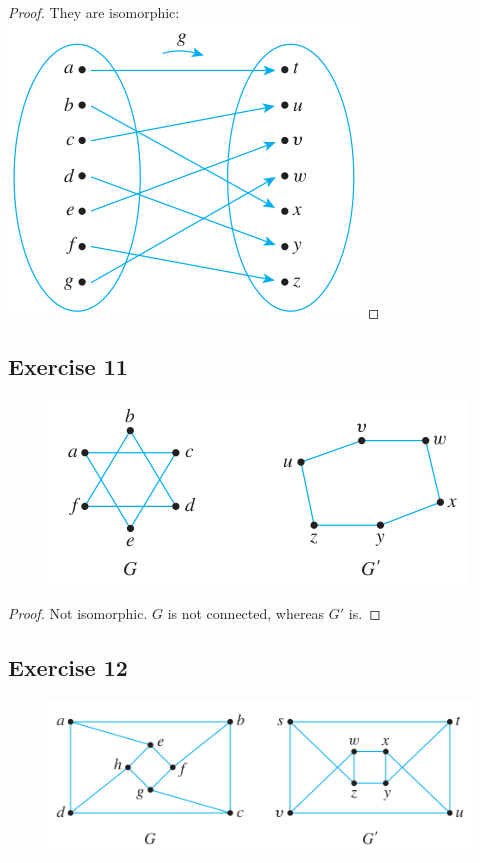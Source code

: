 \documentclass[14pt]{extarticle}
\begin{document}
\begin{proof}
    They are isomorphic:
    \includegraphics[scale=0.4]{../images/10.3.10.1.png}
\end{proof}

\subsection{Exercise 11}
\begin{figure}[ht!]
    \centering
    \includegraphics[scale=0.5]{../images/10.3.11.png}
\end{figure}

\begin{proof}
    Not isomorphic. \(G\) is not connected, whereas \(G'\) is.
\end{proof}

\subsection{Exercise 12}
\begin{figure}[ht!]
    \centering
    \includegraphics[scale=0.5]{../images/10.3.12.png}
\end{figure}
\end{document}
